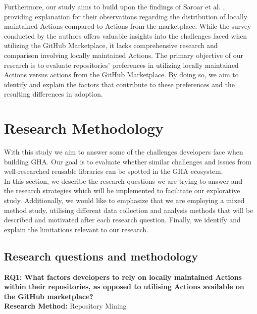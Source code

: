 \documentclass[conference]{IEEEtran}
\begin{document}
	Furthermore, our study aims to build upon the findings of Saroar et al. \cite{saroar2023developers}, providing explanation for their observations regarding the distribution of locally maintained Actions compared to Actions from the marketplace. While the survey conducted by the authors offers valuable insights into the challenges faced when utilizing the GitHub Marketplace, it lacks comprehensive research and comparison involving locally maintained Actions. The primary objective of our research is to evaluate repositories' preferences in utilizing locally maintained Actions versus actions from the GitHub Marketplace. By doing so, we aim to identify and explain the factors that contribute to these preferences and the resulting differences in adoption.




\section{Research Methodology}
    With this study we aim to answer some of the challenges developers face when building GHA. Our goal is to evaluate whether similar challenges and issues from well-researched reusable libraries can be spotted in the GHA ecosystem.\\

    In this section, we describe the research questions we are trying to answer and the research strategies which will be implemented to facilitate our explorative study. Additionally, we would like to emphasize that we are employing a mixed method study, utilising different data collection and analysis methods that will be described and motivated after each research question. Finally, we identify and explain the limitations relevant to our research.

    \subsection{Research questions and methodology}


        \textbf{RQ1: What factors developers to rely on locally maintained Actions within their repositories, as opposed to utilising Actions available on the GitHub marketplace?}\\

        \textbf{Research Method:}  Repository Mining\\
            
\end{document}
